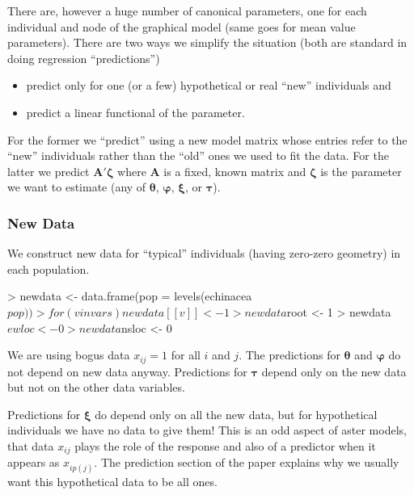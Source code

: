 \documentclass[11pt]{article}
\newcommand{\boldtheta}{{\boldsymbol{\theta}}}
\newcommand{\boldxi}{{\boldsymbol{\xi}}}
\newcommand{\boldtau}{{\boldsymbol{\tau}}}
\newcommand{\boldvarphi}{{\boldsymbol{\varphi}}}
\newcommand{\boldzeta}{{\boldsymbol{\zeta}}}
\newcommand{\boldA}{{\mathbf{A}}}
\begin{document}
There are, however a huge number of canonical parameters, one for each
individual and node of the graphical model (same goes for mean value
parameters).  There are two ways we simplify the situation (both are standard
in doing regression ``predictions'')
\begin{itemize}
\item predict only for one (or a few) hypothetical or real ``new'' individuals
and
\item predict a linear functional of the parameter.
\end{itemize}
For the former we ``predict'' using a new model matrix whose entries refer
to the ``new'' individuals rather than the ``old'' ones we used to fit the
data.  For the latter we predict $\boldA' \boldzeta$ where $\boldA$ is a
fixed, known matrix and $\boldzeta$ is the parameter we want to estimate
(any of $\boldtheta$, $\boldvarphi$, $\boldxi$, or $\boldtau$).

\subsubsection{New Data}

We construct new data for ``typical'' individuals
(having zero-zero geometry) in each population.
\begin{Schunk}
\begin{Sinput}
> newdata <- data.frame(pop = levels(echinacea$pop))
> for (v in vars) newdata[[v]] <- 1
> newdata$root <- 1
> newdata$ewloc <- 0
> newdata$nsloc <- 0
\end{Sinput}
\end{Schunk}

We are using bogus data $x_{i j} = 1$ for all $i$ and $j$.
The predictions for $\boldtheta$ and $\boldvarphi$ do not depend
on new data anyway.
Predictions for $\boldtau$ depend only on the new \verb@root@ data
but not on the other data variables.

Predictions for $\boldxi$ do depend only on all the new data, but
for hypothetical individuals we have no data to give them!  This
is an odd aspect of aster models, that data $x_{i j}$ plays the role of the
response and also of a predictor when it appears as $x_{i p(j)}$.
The prediction section of the paper explains why we usually want this
hypothetical data to be all ones.
\end{document}

